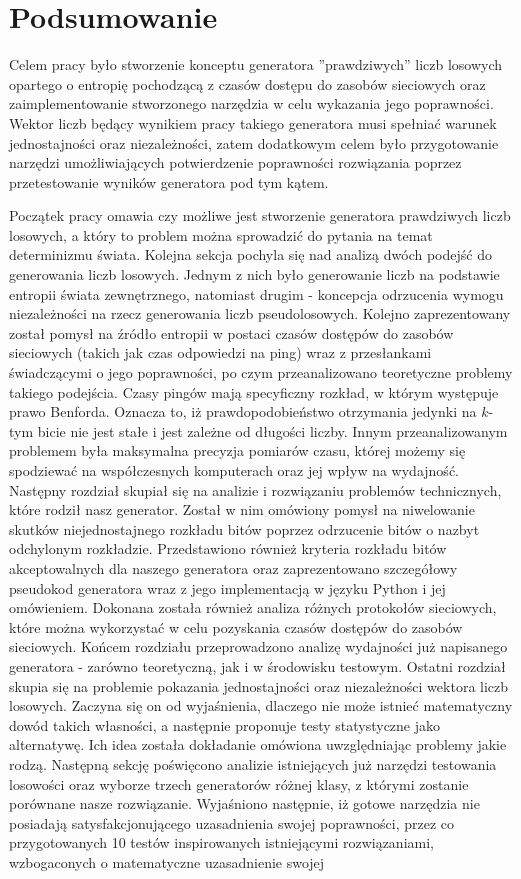 \chapter{Podsumowanie}
\thispagestyle{chapterBeginStyle}
Celem pracy było stworzenie konceptu generatora ''prawdziwych'' liczb losowych opartego o entropię pochodzącą z czasów dostępu do zasobów sieciowych oraz zaimplementowanie stworzonego narzędzia w celu wykazania jego poprawności. Wektor liczb będący wynikiem pracy takiego generatora musi spełniać warunek jednostajności oraz niezależności, zatem dodatkowym celem było przygotowanie narzędzi umożliwiających potwierdzenie poprawności rozwiązania poprzez przetestowanie wyników generatora pod tym kątem.\par
Początek pracy omawia czy możliwe jest stworzenie generatora prawdziwych liczb losowych, a który to problem można sprowadzić do pytania na temat determinizmu świata. Kolejna sekcja pochyla się nad analizą dwóch podejść do generowania liczb losowych. Jednym z nich było generowanie liczb na podstawie entropii świata zewnętrznego, natomiast drugim - koncepcja odrzucenia wymogu niezależności na rzecz generowania liczb pseudolosowych. Kolejno zaprezentowany został pomysł na źródło entropii w postaci czasów dostępów do zasobów sieciowych (takich jak czas odpowiedzi na ping) wraz z przesłankami świadczącymi o jego poprawności, po czym przeanalizowano teoretyczne problemy takiego podejścia. Czasy pingów mają specyficzny rozkład, w którym występuje prawo Benforda. Oznacza to, iż prawdopodobieństwo otrzymania jedynki na $k$-tym bicie nie jest stałe i jest zależne od długości liczby. Innym przeanalizowanym problemem była maksymalna precyzja pomiarów czasu, której możemy się spodziewać na współczesnych komputerach oraz jej wpływ na wydajność. Następny rozdział skupiał się na analizie i rozwiązaniu problemów technicznych, które rodził nasz generator. Został w nim omówiony pomysł na niwelowanie skutków niejednostajnego rozkładu bitów poprzez odrzucenie bitów o nazbyt odchylonym rozkładzie. Przedstawiono również kryteria rozkładu bitów akceptowalnych dla naszego generatora oraz zaprezentowano szczegółowy pseudokod generatora wraz z jego implementacją w języku Python i jej omówieniem. Dokonana została  również analiza różnych protokołów sieciowych, które można wykorzystać w celu pozyskania czasów dostępów do zasobów sieciowych. Końcem rozdziału przeprowadzono analizę wydajności już napisanego generatora - zarówno teoretyczną, jak i w środowisku testowym. Ostatni rozdział skupia się na problemie pokazania jednostajności oraz niezależności wektora liczb losowych. Zaczyna się on od wyjaśnienia, dlaczego nie może istnieć matematyczny dowód takich własności, a następnie proponuje testy statystyczne jako alternatywę. Ich idea została dokładanie omówiona uwzględniając problemy jakie rodzą. Następną sekcję poświęcono analizie istniejących już narzędzi testowania losowości oraz wyborze trzech generatorów różnej klasy, z którymi zostanie porównane nasze rozwiązanie. Wyjaśniono następnie, iż gotowe narzędzia nie posiadają satysfakcjonującego uzasadnienia swojej poprawności, przez co przygotowanych 10 testów inspirowanych istniejącymi rozwiązaniami, wzbogaconych o matematyczne uzasadnienie swojej 